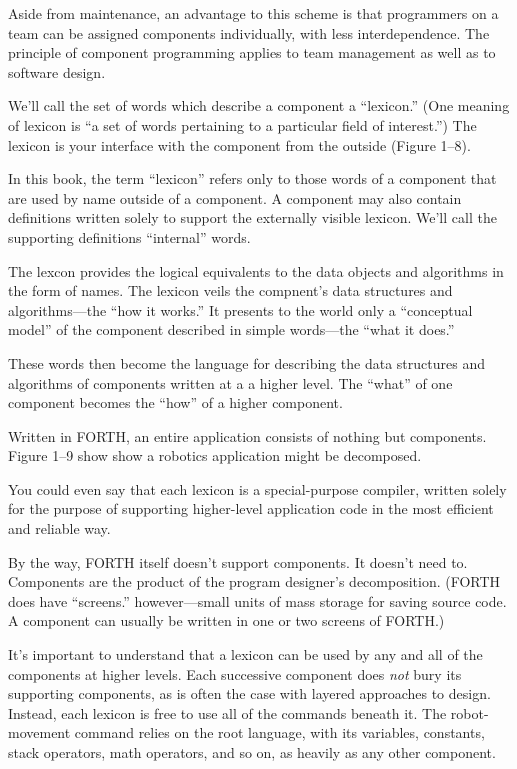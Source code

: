 Aside from maintenance, an advantage to this scheme is that programmers
on a team can be assigned components individually, with less interdependence.
The principle of component programming applies to team management
as well as to software design.

We'll call the set of words which describe a component a {}``lexicon.''
(One meaning of lexicon is {}``a set of words pertaining to a particular
field of interest.'') The lexicon is your interface with the component
from the outside (Figure 1--8).

In this book, the term {}``lexicon'' refers only to those words
of a component that are used by name outside of a component. A component
may also contain definitions written solely to support the externally
visible lexicon. We'll call the supporting definitions {}``internal''
words.

The lexcon provides the logical equivalents to the data objects and
algorithms in the form of names. The lexicon veils the compnent's
data structures and algorithms---the {}``how it works.'' It presents
to the world only a {}``conceptual model'' of the component described
in simple words---the {}``what it does.''

These words then become the language for describing the data structures
and algorithms of components written at a a higher level. The {}``what''
of one component becomes the {}``how'' of a higher component.

Written in FORTH, an entire application consists of nothing but components.
Figure 1--9 show show a robotics application might be decomposed.

You could even say that each lexicon is a special-purpose compiler,
written solely for the purpose of supporting higher-level application
code in the most efficient and reliable way.

By the way, FORTH itself doesn't support components. It doesn't need
to. Components are the product of the program designer's decomposition.
(FORTH does have {}``screens.'' however---small units of mass storage
for saving source code. A component can usually be written in one
or two screens of FORTH.)

It's important to understand that a lexicon can be used by any and
all of the components at higher levels. Each successive component
does \emph{not} bury its supporting components, as is often the case
with layered approaches to design. Instead, each lexicon is free to
use all of the commands beneath it. The robot-movement command relies
on the root language, with its variables, constants, stack operators,
math operators, and so on, as heavily as any other component.

